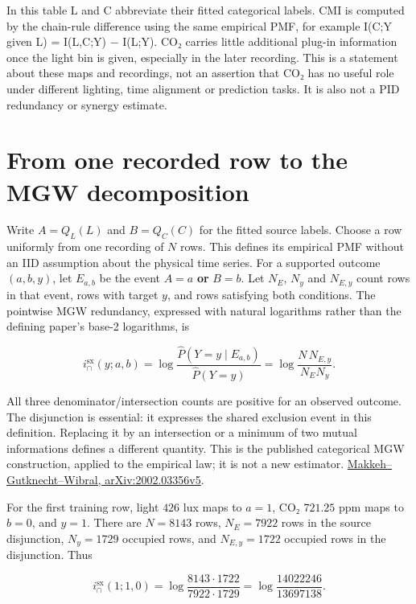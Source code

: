 In this table L and C abbreviate their fitted categorical labels. CMI is computed by the chain-rule difference using the same empirical PMF, for example I(C;Y given L) = I(L,C;Y) − I(L;Y). CO₂ carries little additional plug-in information once the light bin is given, especially in the later recording. This is a statement about these maps and recordings, not an assertion that CO₂ has no useful role under different lighting, time alignment or prediction tasks. It is also not a PID redundancy or synergy estimate.

\par{}

\section{From one recorded row to the MGW decomposition}\label{from-one-recorded-row-to-the-mgw-decomposition}

Write \(A=Q_L(L)\) and \(B=Q_C(C)\) for the fitted source labels. Choose a row uniformly from one recording of \(N\) rows. This defines its empirical PMF without an IID assumption about the physical time series. For a supported outcome \((a,b,y)\), let \(E_{a,b}\) be the event \(A=a\) \textbf{or} \(B=b\). Let \(N_E\), \(N_y\) and \(N_{E,y}\) count rows in that event, rows with target \(y\), and rows satisfying both conditions. The pointwise MGW redundancy, expressed with natural logarithms rather than the defining paper's base-2 logarithms, is

\[
i^{\mathrm{sx}}_\cap(y;a,b)
=\log\frac{\widehat P(Y=y\mid E_{a,b})}{\widehat P(Y=y)}
=\log\frac{N\,N_{E,y}}{N_E N_y}.
\]

All three denominator/intersection counts are positive for an observed outcome. The disjunction is essential: it expresses the shared exclusion event in this definition. Replacing it by an intersection or a minimum of two mutual informations defines a different quantity. This is the published categorical MGW construction, applied to the empirical law; it is not a new estimator. \href{https://arxiv.org/abs/2002.03356v5}{Makkeh--Gutknecht--Wibral, arXiv:2002.03356v5}.

For the first training row, light \(426\) lux maps to \(a=1\), CO₂ \(721.25\) ppm maps to \(b=0\), and \(y=1\). There are \(N=8143\) rows, \(N_E=7922\) rows in the source disjunction, \(N_y=1729\) occupied rows, and \(N_{E,y}=1722\) occupied rows in the disjunction. Thus

\[
i^{\mathrm{sx}}_\cap(1;1,0)
=\log\frac{8143\cdot1722}{7922\cdot1729}
=\log\frac{14022246}{13697138}.
\]

